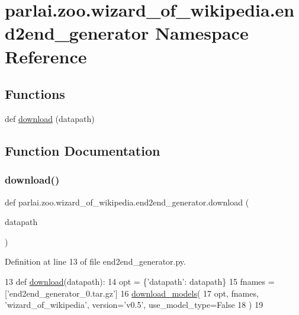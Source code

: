 \hypertarget{namespaceparlai_1_1zoo_1_1wizard__of__wikipedia_1_1end2end__generator}{}\section{parlai.\+zoo.\+wizard\+\_\+of\+\_\+wikipedia.\+end2end\+\_\+generator Namespace Reference}
\label{namespaceparlai_1_1zoo_1_1wizard__of__wikipedia_1_1end2end__generator}
\subsection*{Functions}
\begin{DoxyCompactItemize}
\item 
def \hyperlink{namespaceparlai_1_1zoo_1_1wizard__of__wikipedia_1_1end2end__generator_a3a34c992127ebe52eb1d98dcebbb4d47}{download} (datapath)
\end{DoxyCompactItemize}


\subsection{Function Documentation}
\mbox{\label{namespaceparlai_1_1zoo_1_1wizard__of__wikipedia_1_1end2end__generator_a3a34c992127ebe52eb1d98dcebbb4d47}} 
\subsubsection{\texorpdfstring{download()}{download()}}
{\footnotesize\ttfamily def parlai.\+zoo.\+wizard\+\_\+of\+\_\+wikipedia.\+end2end\+\_\+generator.\+download (\begin{DoxyParamCaption}\item[{}]{datapath }\end{DoxyParamCaption})}



Definition at line 13 of file end2end\+\_\+generator.\+py.


\begin{DoxyCode}
13 \textcolor{keyword}{def }\hyperlink{namespaceparlai_1_1zoo_1_1wizard__of__wikipedia_1_1end2end__generator_a3a34c992127ebe52eb1d98dcebbb4d47}{download}(datapath):
14     opt = \{\textcolor{stringliteral}{'datapath'}: datapath\}
15     fnames = [\textcolor{stringliteral}{'end2end\_generator\_0.tar.gz'}]
16     \hyperlink{namespaceparlai_1_1core_1_1build__data_ab697f23f05d3e36d7979fe5e0ed7911e}{download\_models}(
17         opt, fnames, \textcolor{stringliteral}{'wizard\_of\_wikipedia'}, version=\textcolor{stringliteral}{'v0.5'}, use\_model\_type=\textcolor{keyword}{False}
18     )
19 \end{DoxyCode}

